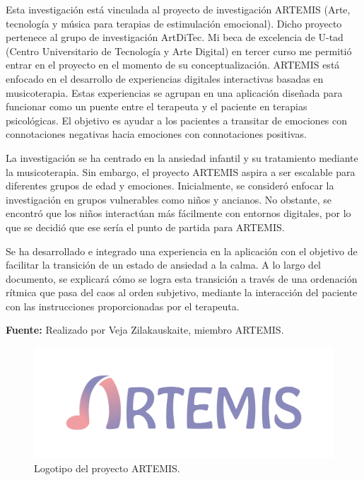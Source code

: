 Esta investigación está vinculada al proyecto de investigación ARTEMIS (Arte, tecnología y música para terapias de estimulación emocional). Dicho proyecto pertenece al grupo de investigación ArtDiTec. Mi beca de excelencia de U-tad (Centro Universitario de Tecnología y Arte Digital) en tercer curso me permitió entrar en el proyecto en el momento de su conceptualización. ARTEMIS está enfocado en el desarrollo de experiencias digitales interactivas basadas en musicoterapia. Estas experiencias se agrupan en una aplicación diseñada para funcionar como un puente entre el terapeuta y el paciente en terapias psicológicas. El objetivo es ayudar a los pacientes a transitar de emociones con connotaciones negativas hacia emociones con connotaciones positivas.

La investigación se ha centrado en la ansiedad infantil y su tratamiento mediante la musicoterapia. Sin embargo, el proyecto ARTEMIS aspira a ser escalable para diferentes grupos de edad y emociones. Inicialmente, se consideró enfocar la investigación en grupos vulnerables como niños y ancianos. No obstante, se encontró que los niños interactúan más fácilmente con entornos digitales, por lo que se decidió que ese sería el punto de partida para ARTEMIS.

Se ha desarrollado e integrado una experiencia en la aplicación con el objetivo de facilitar la transición de un estado de ansiedad a la calma. A lo largo del documento, se explicará cómo se logra esta transición a través de una ordenación rítmica que pasa del caos al orden subjetivo, mediante la interacción del paciente con las instrucciones proporcionadas por el terapeuta.

\begin{center}
	\textbf{Fuente:} Realizado por Veja Zilakauskaite, miembro ARTEMIS.
	\vspace{-30pt}
\end{center}

\begin{figure} [h!]
	\centering
	\includegraphics[width=0.6\linewidth]{Figuras/Introduccion/1_LogoArtemis}
	\caption{Logotipo del proyecto ARTEMIS.}
	\label{fig:logoArtemis}
\end{figure}

